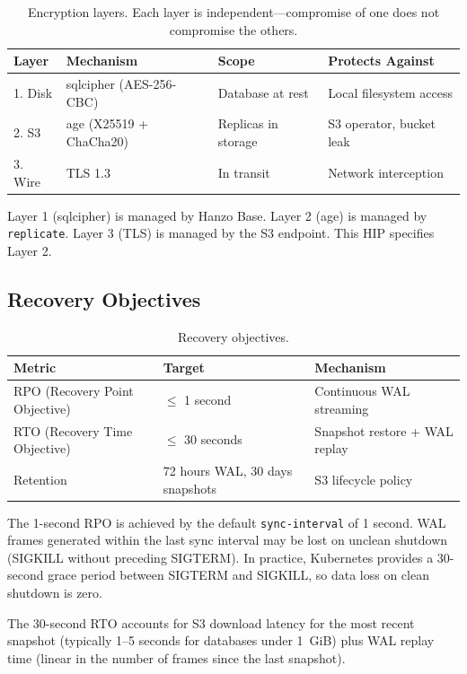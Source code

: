 \begin{table}[H]
\centering
\begin{tabular}{@{}llll@{}}
\toprule
\textbf{Layer} & \textbf{Mechanism} & \textbf{Scope} & \textbf{Protects Against} \\
\midrule
1. Disk   & sqlcipher (AES-256-CBC)      & Database at rest     & Local filesystem access \\
2. S3     & age (X25519 + ChaCha20)      & Replicas in storage  & S3 operator, bucket leak \\
3. Wire   & TLS 1.3                       & In transit           & Network interception \\
\bottomrule
\end{tabular}
\caption{Encryption layers. Each layer is independent---compromise of one
does not compromise the others.}
\label{tab:encryption}
\end{table}

Layer 1 (sqlcipher) is managed by Hanzo Base. Layer 2 (age) is managed by
\texttt{replicate}. Layer 3 (TLS) is managed by the S3 endpoint. This HIP
specifies Layer 2.

\subsection{Recovery Objectives}

\begin{table}[H]
\centering
\begin{tabular}{@{}lll@{}}
\toprule
\textbf{Metric} & \textbf{Target} & \textbf{Mechanism} \\
\midrule
RPO (Recovery Point Objective) & $\leq$ 1 second & Continuous WAL streaming \\
RTO (Recovery Time Objective)  & $\leq$ 30 seconds & Snapshot restore + WAL replay \\
Retention                      & 72 hours WAL, 30 days snapshots & S3 lifecycle policy \\
\bottomrule
\end{tabular}
\caption{Recovery objectives.}
\label{tab:recovery}
\end{table}

The 1-second RPO is achieved by the default \texttt{sync-interval} of 1
second. WAL frames generated within the last sync interval may be lost on
unclean shutdown (SIGKILL without preceding SIGTERM). In practice,
Kubernetes provides a 30-second grace period between SIGTERM and SIGKILL, so
data loss on clean shutdown is zero.

The 30-second RTO accounts for S3 download latency for the most recent
snapshot (typically 1--5 seconds for databases under 1~GiB) plus WAL replay
time (linear in the number of frames since the last snapshot).

